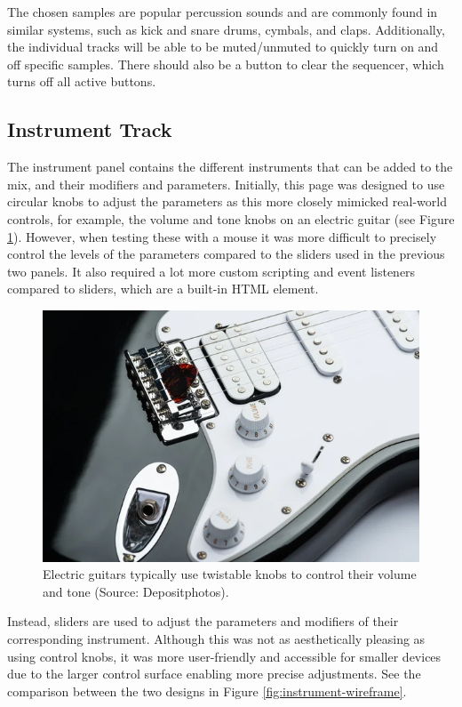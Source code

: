 The chosen samples are popular percussion sounds and are commonly found in similar systems, such as kick and snare drums, cymbals, and claps. Additionally, the individual tracks will be able to be muted/unmuted to quickly turn on and off specific samples. There should also be a button to clear the sequencer, which turns off all active buttons.


\subsection{Instrument Track}
The instrument panel contains the different instruments that can be added to the mix, and their modifiers and parameters. Initially, this page was designed to use circular knobs to adjust the parameters as this more closely mimicked real-world controls, for example, the volume and tone knobs on an electric guitar (see Figure \ref{fig:guitar-knobs}). However, when testing these with a mouse it was more difficult to precisely control the levels of the parameters compared to the sliders used in the previous two panels. It also required a lot more custom scripting and event listeners compared to sliders, which are a built-in HTML element.

\begin{figure}[htb]
    \centering
    \includegraphics[width=0.5\linewidth]{images/design/guitar-knobs.png}    
    \caption{Electric guitars typically use twistable knobs to control their volume and tone (Source: Depositphotos).}
    \label{fig:guitar-knobs}
\end{figure}

Instead, sliders are used to adjust the parameters and modifiers of their corresponding instrument. Although this was not as aesthetically pleasing as using control knobs, it was more user-friendly and accessible for smaller devices due to the larger control surface enabling more precise adjustments. See the comparison between the two designs in Figure \ref{fig:instrument-wireframe}.


